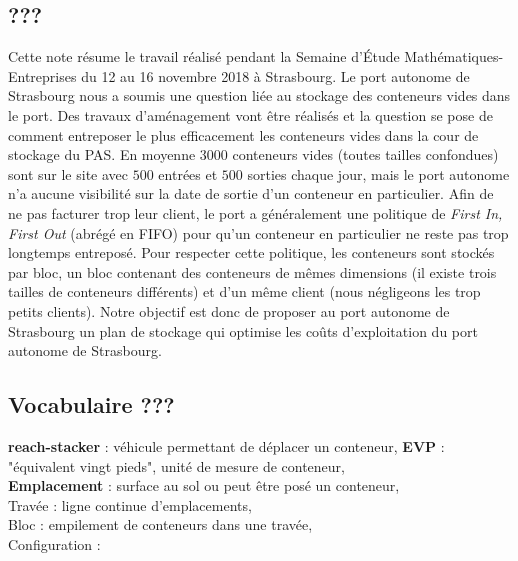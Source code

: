 \documentclass{article}
\begin{document}
\subsection{ ??? }

Cette note résume le travail réalisé pendant la Semaine d'\'Etude Mathématiques-Entreprises du 12 au 16 novembre 2018 à Strasbourg. 
Le port autonome de Strasbourg nous a soumis une question liée au stockage des conteneurs vides dans le port. 
Des travaux d'aménagement vont être réalisés et la question se pose de comment entreposer le plus efficacement les conteneurs vides dans la cour de stockage du PAS. 
En moyenne $3000$ conteneurs vides (toutes tailles confondues) sont sur le site avec $500$ entrées et $500$ sorties chaque jour, mais le port autonome n'a aucune visibilité sur la date de sortie d'un conteneur en particulier. 
Afin de ne pas facturer trop leur client, le port a généralement une politique de {\it First In, First Out} (abrégé en FIFO) pour qu'un conteneur en particulier ne reste pas trop longtemps entreposé. Pour respecter cette politique, les conteneurs sont stockés par bloc, un bloc contenant des conteneurs de mêmes dimensions (il existe trois tailles de conteneurs différents) et d'un même client (nous négligeons les trop petits clients).
Notre objectif est donc de proposer au port autonome de Strasbourg un plan de stockage qui optimise les coûts d'exploitation du port autonome de Strasbourg. 

\subsection{Vocabulaire ???}
\textbf{reach-stacker} : véhicule permettant de déplacer un conteneur,
\textbf{EVP} : "équivalent vingt pieds", unité de mesure de conteneur, \\
\textbf{Emplacement} : surface au sol ou peut être posé un conteneur, \\
Travée : ligne continue d'emplacements, \\
Bloc : empilement de conteneurs dans une travée, \\
Configuration : 
\end{document}
